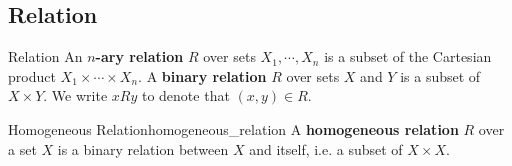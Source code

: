\subsection{Relation}
\begin{definition}{Relation}{}
    An \textbf{$n$-ary relation} $R$ over sets $X_1, \cdots, X_n$ is a subset of the Cartesian product $X_1 \times \cdots \times X_n$. A \textbf{binary relation} $R$ over sets $X$ and $Y$ is a subset of $X \times Y$. We write $xRy$ to denote that $(x, y) \in R$.
\end{definition}

\begin{definition}{Homogeneous Relation}{homogeneous_relation}
    A \textbf{homogeneous relation} $R$ over a set $X$ is a binary relation between $X$ and itself, i.e. a subset of $X \times X$. 
\end{definition}

